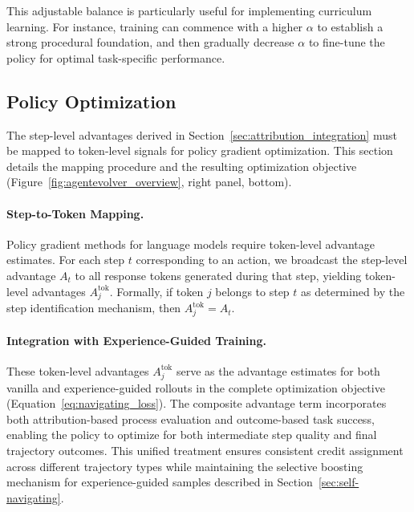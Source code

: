 This adjustable balance is particularly useful for implementing curriculum learning. For instance, training can commence with a higher $\alpha$ to establish a strong procedural foundation, and then gradually decrease $\alpha$ to fine-tune the policy for optimal task-specific performance.


\subsection{Policy Optimization}
\label{sec:grpo_integration}
The step-level advantages derived in Section~\ref{sec:attribution_integration} must be mapped to token-level signals for policy gradient optimization. This section details the mapping procedure and the resulting optimization objective (Figure~\ref{fig:agentevolver_overview}, right panel, bottom).



\paragraph{Step-to-Token Mapping.}
Policy gradient methods for language models require token-level advantage estimates. For each step $t$ corresponding to an action, we broadcast the step-level advantage $A_t$ to all response tokens generated during that step, yielding token-level advantages $A^{\text{tok}}_j$. Formally, if token $j$ belongs to step $t$ as determined by the step identification mechanism, then $A^{\text{tok}}_j = A_t$.




\paragraph{Integration with Experience-Guided Training.}
These token-level advantages $A^{\text{tok}}_j$ serve as the advantage estimates for both vanilla and experience-guided rollouts in the complete optimization objective (Equation~\ref{eq:navigating_loss}). The composite advantage term incorporates both attribution-based process evaluation and outcome-based task success, enabling the policy to optimize for both intermediate step quality and final trajectory outcomes. This unified treatment ensures consistent credit assignment across different trajectory types while maintaining the selective boosting mechanism for experience-guided samples described in Section~\ref{sec:self-navigating}.

